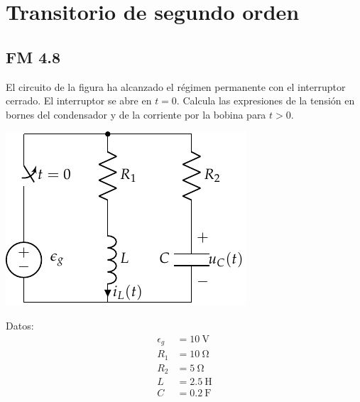 \documentclass[12pt]{article}
\begin{document}


\section{Transitorio de segundo orden}

\subsection{FM 4.8}

El circuito de la figura ha alcanzado el régimen permanente con el interruptor cerrado. El interruptor se abre en $t = 0$. Calcula las expresiones de la tensión en bornes del condensador y de la corriente por la bobina para $t > 0$.

\vspace*{1cm}

\begin{minipage}{0.7\textwidth}
  \includegraphics[scale=0.95]{figs/FM_4_8}
\end{minipage}
\hfill
\begin{minipage}{0.3\textwidth}
Datos:
\begin{align*}
  \epsilon_g &= \SI{10}{\volt}\\
  R_1 &= \SI{10}{\ohm}\\
  R_2 &= \SI{5}{\ohm}\\
  L &= \SI{2.5}{\henry}\\
  C &= \SI{0.2}{\farad}      
\end{align*}
\end{minipage}
\end{document}
